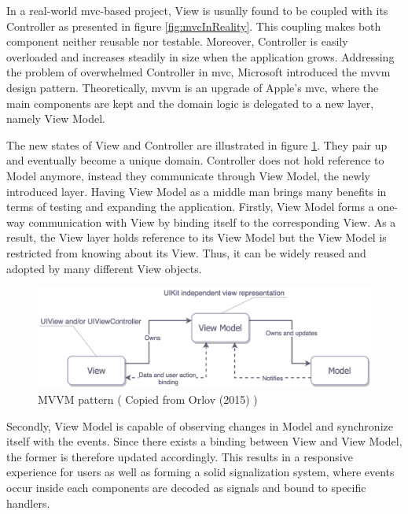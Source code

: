 \documentclass[11pt,a4paper,oneside,article]{memoir}
\begin{document}
In a real-world \gls{mvc}-based project, View is usually found to be coupled with its Controller as presented in figure \ref{fig:mvcInReality}. This coupling makes both component neither reusable nor testable. Moreover, Controller is easily overloaded and increases steadily in size when the application grows. Addressing the problem of overwhelmed Controller in \gls{mvc}, Microsoft introduced the \gls{mvvm} design pattern\cite{microsoft:mvvm}. Theoretically, \gls{mvvm} is an upgrade of Apple's \gls{mvc}, where the main components are kept and the domain logic is delegated to a new layer, namely View Model. 
 
The new states of View and Controller are illustrated in figure \ref{fig:mvvm}. They pair up and eventually become a unique domain. Controller does not hold reference to Model anymore, instead they communicate through View Model, the newly introduced layer. Having View Model as a middle man brings many benefits in terms of testing and expanding the application. Firstly, View Model forms a one-way communication with View by binding itself to the corresponding View. As a result, the View layer holds reference to its View Model but the View Model is restricted from knowing about its View. Thus, it can be widely reused and adopted by many different View objects.

\begin{figure}[h]

\centering
\includegraphics[width=\textwidth]{mvvm}

\caption{MVVM pattern ( Copied from Orlov (2015) \cite{medium:pattern})}
\label{fig:mvvm}

\end{figure}


Secondly, View Model is capable of observing changes in Model and synchronize itself with the events. Since there exists a binding between View and View Model, the former is therefore updated accordingly. This results in a responsive experience for users as well as forming a solid signalization system, where events occur inside each components are decoded as signals and bound to specific handlers.\cite{microsoft:mvvm}
\end{document}
